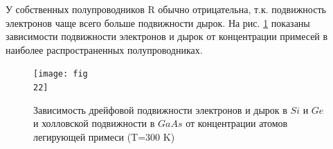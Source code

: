 У собственных полупроводников R обычно отрицательна, т.к. подвижность электронов чаще всего больше подвижности дырок. На рис. \ref{fig:9} показаны зависимости подвижности электронов и дырок от концентрации примесей в наиболее распространенных полупроводниках.

\begin{figure}[h!]
	\centering
	\texttt{[image: fig\\22]}
	\caption{Зависимость дрейфовой подвижности электронов и дырок в $Si$ и $Ge$ и холловской подвижности в $GaAs$ от концентрации атомов легирующей примеси (T=300 K)}
	\label{fig:9}
\end{figure}

% 



